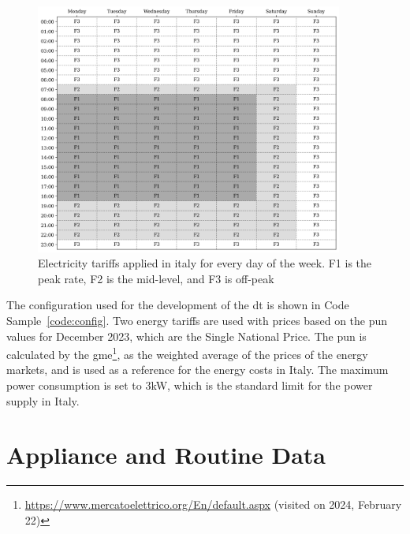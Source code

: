 \begin{figure}
    \centering
    \includegraphics[width=0.9\textwidth]{images/costs.png}
    \caption[Electricity tariffs applied in italy for every day of the week]{Electricity tariffs applied in italy for every day of the week. F1 is the peak rate, F2 is the mid-level, and F3 is off-peak}
    \label{fig:costs_matrix}
\end{figure}

The configuration used for the development of the \acrshort{dt} is shown in Code Sample~\ref{code:config}. Two energy tariffs are used with prices based on the \acrfull{pun} values for December 2023, which are the Single National Price. The \acrshort{pun} is calculated by the \acrfull{gme}\footnote{\url{https://www.mercatoelettrico.org/En/default.aspx} (visited on 2024, February 22)}, as the weighted average of the prices of the energy markets, and is used as a reference for the energy costs in Italy. The maximum power consumption is set to 3kW, which is the standard limit for the power supply in Italy.

\section{Appliance and Routine Data}

